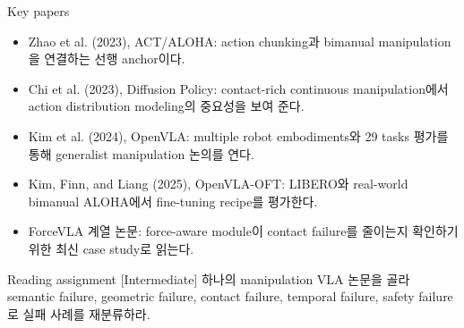 \begin{sourcebox}{Key papers}
\begin{itemize}
  \item Zhao et al. (2023), ACT/ALOHA: action chunking과 bimanual manipulation을 연결하는 선행 anchor이다.
  \item Chi et al. (2023), Diffusion Policy: contact-rich continuous manipulation에서 action distribution modeling의 중요성을 보여 준다.
  \item Kim et al. (2024), OpenVLA: multiple robot embodiments와 29 tasks 평가를 통해 generalist manipulation 논의를 연다.
  \item Kim, Finn, and Liang (2025), OpenVLA-OFT: LIBERO와 real-world bimanual ALOHA에서 fine-tuning recipe를 평가한다.
  \item ForceVLA 계열 논문: force-aware module이 contact failure를 줄이는지 확인하기 위한 최신 case study로 읽는다.
\end{itemize}
\end{sourcebox}

\begin{assignmentbox}{Reading assignment [Intermediate]}
하나의 manipulation VLA 논문을 골라 semantic failure, geometric failure, contact failure, temporal failure, safety failure로 실패 사례를 재분류하라.
\end{assignmentbox}
